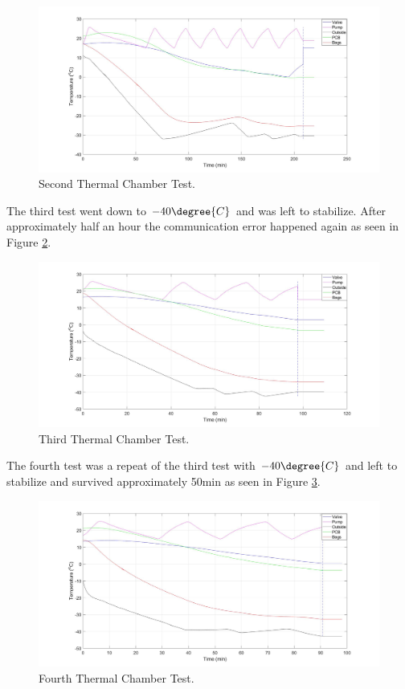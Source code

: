 \documentclass[a4paper,12pt,oneside]{article}
\begin{document}
\begin{appendices}
\begin{figure}[H]
    \centering
    \includegraphics[width=\linewidth]{appendix/img/test-results/Thermal-Test-3.jpg}
    \caption{Second Thermal Chamber Test.}
    \label{fig:test-3-thermal}
\end{figure}

The third test went down to $-40\degree{C}$ and was left to stabilize. After approximately half an hour the communication error happened again as seen in Figure \ref{fig:test-4-thermal}.

\begin{figure}[H]
    \centering
    \includegraphics[width=\linewidth]{appendix/img/test-results/Thermal-Test-4.jpg}
    \caption{Third Thermal Chamber Test.}
    \label{fig:test-4-thermal}
\end{figure}

The fourth test was a repeat of the third test with $-40\degree{C}$ and left to stabilize and survived approximately 50min as seen in Figure \ref{fig:test-5-thermal}. 

\begin{figure}[H]
    \centering
    \includegraphics[width=\linewidth]{appendix/img/test-results/Thermal-Test-5.jpg}
    \caption{Fourth Thermal Chamber Test.}
    \label{fig:test-5-thermal}
\end{figure}


\end{appendices}
\end{document}
